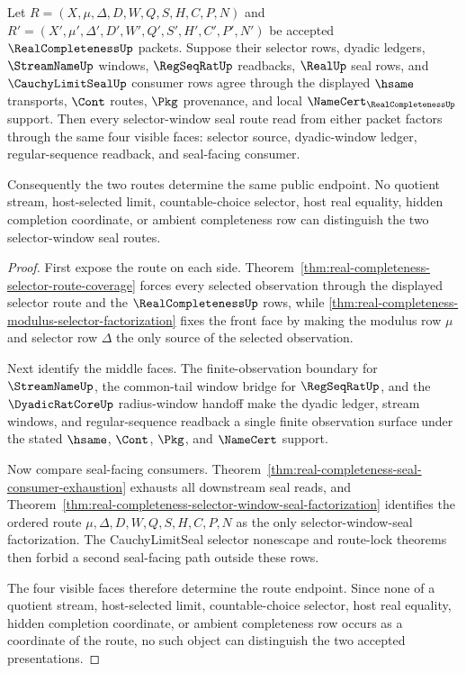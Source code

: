 \begin{theorem}
\label{thm:real-completeness-selector-seal-four-face-uniqueness}
Let $R=(X,\mu,\Delta,D,W,Q,S,H,C,P,N)$ and $R'=(X',\mu',\Delta',D',W',Q',S',H',C',P',N')$ be accepted $\RealCompletenessUp$ packets. Suppose their selector rows, dyadic ledgers, $\StreamNameUp$ windows, $\RegSeqRatUp$ readbacks, $\RealUp$ seal rows, and $\CauchyLimitSealUp$ consumer rows agree through the displayed $\hsame$ transports, $\Cont$ routes, $\Pkg$ provenance, and local $\NameCert_{\RealCompletenessUp}$ support. Then every selector-window seal route read from either packet factors through the same four visible faces: selector source, dyadic-window ledger, regular-sequence readback, and seal-facing consumer.

Consequently the two routes determine the same public endpoint. No quotient stream, host-selected limit, countable-choice selector, host real equality, hidden completion coordinate, or ambient completeness row can distinguish the two selector-window seal routes.
\end{theorem}
\begin{proof}
First expose the route on each side. Theorem~\ref{thm:real-completeness-selector-route-coverage} forces every selected observation through the displayed selector route and the $\RealCompletenessUp$ rows, while \autoref{thm:real-completeness-modulus-selector-factorization} fixes the front face by making the modulus row $\mu$ and selector row $\Delta$ the only source of the selected observation.

Next identify the middle faces. The finite-observation boundary for $\StreamNameUp$, the common-tail window bridge for $\RegSeqRatUp$, and the $\DyadicRatCoreUp$ radius-window handoff make the dyadic ledger, stream windows, and regular-sequence readback a single finite observation surface under the stated $\hsame$, $\Cont$, $\Pkg$, and $\NameCert$ support.

Now compare seal-facing consumers. Theorem~\ref{thm:real-completeness-seal-consumer-exhaustion} exhausts all downstream seal reads, and Theorem~\ref{thm:real-completeness-selector-window-seal-factorization} identifies the ordered route $\mu,\Delta,D,W,Q,S,H,C,P,N$ as the only selector-window-seal factorization. The CauchyLimitSeal selector nonescape and route-lock theorems then forbid a second seal-facing path outside these rows.

The four visible faces therefore determine the route endpoint. Since none of a quotient stream, host-selected limit, countable-choice selector, host real equality, hidden completion coordinate, or ambient completeness row occurs as a coordinate of the route, no such object can distinguish the two accepted presentations.
\end{proof}

